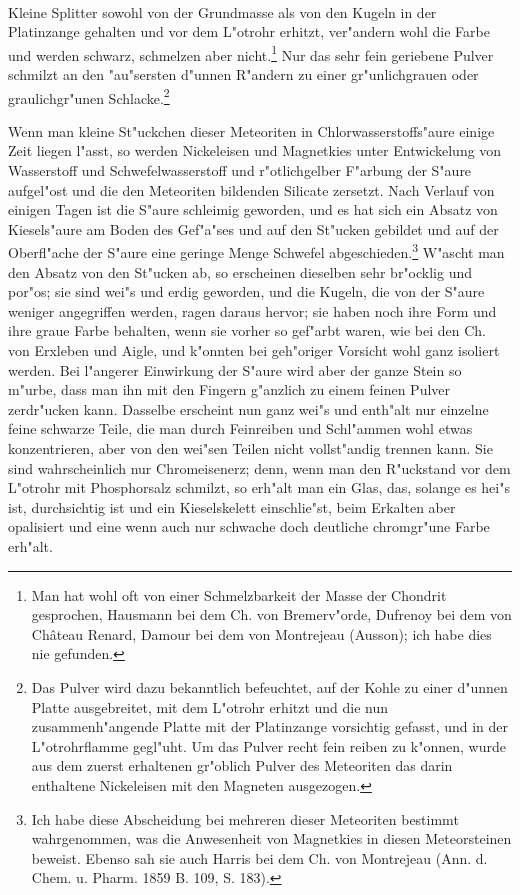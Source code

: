 \documentclass[a4paper, 11pt, oneside, german]{article}
\begin{document}
\paragraph{}
Kleine Splitter sowohl von der Grundmasse als von den Kugeln in der Platinzange gehalten und vor dem L"otrohr erhitzt, ver"andern wohl die Farbe und werden schwarz, schmelzen aber nicht.\footnote{Man hat wohl oft von einer Schmelzbarkeit der Masse der Chondrit gesprochen, Hausmann bei dem Ch. von Bremerv"orde, Dufrenoy bei dem von Château Renard, Damour bei dem von Montrejeau (Ausson); ich habe dies nie gefunden.} Nur das sehr fein geriebene Pulver schmilzt an den "au"sersten d"unnen R"andern zu einer gr"unlichgrauen oder graulichgr"unen Schlacke.\footnote{Das Pulver wird dazu bekanntlich befeuchtet, auf der Kohle zu einer d"unnen Platte ausgebreitet, mit dem L"otrohr erhitzt und die nun zusammenh"angende Platte mit der Platinzange vorsichtig gefasst, und in der L"otrohrflamme gegl"uht. Um das Pulver recht fein reiben zu k"onnen, wurde aus dem zuerst erhaltenen gr"oblich Pulver des Meteoriten das darin enthaltene Nickeleisen mit den Magneten ausgezogen.}

Wenn man kleine St"uckchen dieser Meteoriten in Chlorwasserstoffs"aure einige Zeit liegen l"asst, so werden Nickeleisen und Magnetkies unter Entwickelung von Wasserstoff und Schwefelwasserstoff und r"otlichgelber F"arbung der S"aure aufgel"ost und die den Meteoriten bildenden Silicate zersetzt. Nach Verlauf von einigen Tagen ist die S"aure schleimig geworden, und es hat sich ein Absatz von Kiesels"aure am Boden des Gef"a"ses und auf den St"ucken gebildet und auf der Oberfl"ache der S"aure eine geringe Menge Schwefel abgeschieden.\footnote{Ich habe diese Abscheidung bei mehreren dieser Meteoriten bestimmt wahrgenommen, was die Anwesenheit von Magnetkies in diesen Meteorsteinen beweist. Ebenso sah sie auch Harris bei dem Ch. von Montrejeau (Ann. d. Chem. u. Pharm. 1859 B. 109, S. 183).} W"ascht man den Absatz von den St"ucken ab, so erscheinen dieselben sehr br"ocklig und por"os; sie sind wei"s und erdig geworden, und die Kugeln, die von der S"aure weniger angegriffen werden, ragen daraus hervor; sie haben noch ihre Form und ihre graue Farbe behalten, wenn sie vorher so gef"arbt waren, wie bei den Ch. von Erxleben und Aigle, und k"onnten bei geh"origer Vorsicht wohl ganz isoliert werden. Bei l"angerer Einwirkung der S"aure wird aber der ganze Stein so m"urbe, dass man ihn mit den Fingern g"anzlich zu einem feinen Pulver zerdr"ucken kann. Dasselbe erscheint nun ganz wei"s und enth"alt nur einzelne feine schwarze Teile, die man durch Feinreiben und Schl"ammen wohl etwas konzentrieren, aber von den wei"sen Teilen nicht vollst"andig trennen kann. Sie sind wahrscheinlich nur Chromeisenerz; denn, wenn man den R"uckstand vor dem L"otrohr mit Phosphorsalz schmilzt, so erh"alt man ein Glas, das, solange es hei"s ist, durchsichtig ist und ein Kieselskelett einschlie"st, beim Erkalten aber opalisiert und eine wenn auch nur schwache doch deutliche chromgr"une Farbe erh"alt.
\end{document}
